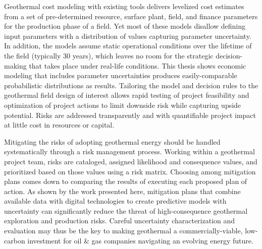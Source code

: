 Geothermal cost modeling with existing tools delivers levelized cost estimates from a set of pre-determined resource, surface plant, field, and finance parameters for the production phase of a field. Yet most of these models disallow defining input parameters with a distribution of values capturing parameter uncertainty. In addition, the models assume static operational conditions over the lifetime of the field (typically 30 years), which leaves no room for the strategic decision-making that takes place under real-life conditions. This thesis shows economic modeling that includes parameter uncertainties produces easily-comparable probabilistic distributions as results. Tailoring the model and decision rules to the geothermal field design of interest allows rapid testing of project feasibility and optimization of project actions to limit downside risk while capturing upside potential. Risks are addressed transparently and with quantifiable project impact at little cost in resources or capital.

Mitigating the risks of adopting geothermal energy should be handled systematically through a risk management process. Working within a geothermal project team, risks are cataloged, assigned likelihood and consequence values, and prioritized based on those values using a risk matrix. Choosing among mitigation plans comes down to comparing the results of executing each proposed plan of action. As shown by the work presented here, mitigation plans that combine available data with digital technologies to create predictive models with uncertainty can significantly reduce the threat of high-consequence geothermal exploration and production risks. Careful uncertainty characterization and evaluation may thus be the key to making geothermal a commercially-viable, low-carbon investment for oil \& gas companies navigating an evolving energy future. 
